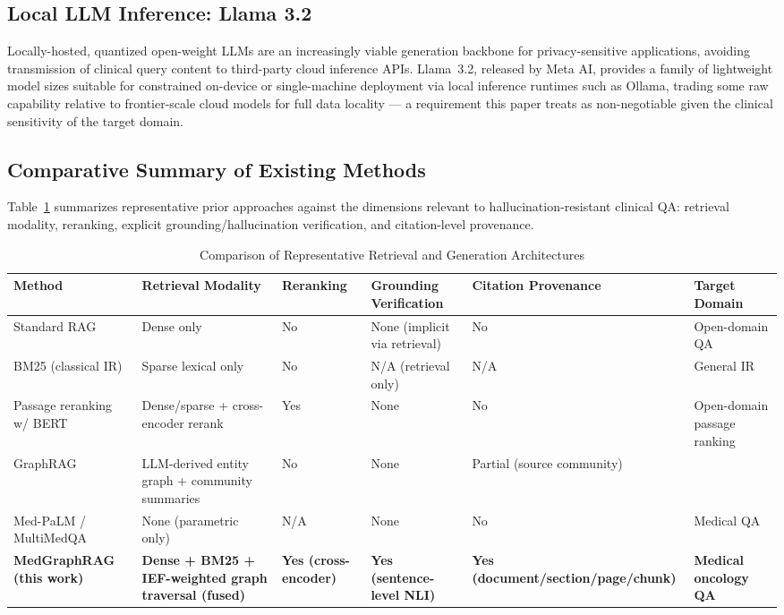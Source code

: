 \documentclass[conference]{IEEEtran}
\begin{document}
\subsection{Local LLM Inference: Llama 3.2}
Locally-hosted, quantized open-weight LLMs are an increasingly viable generation backbone for privacy-sensitive applications, avoiding transmission of clinical query content to third-party cloud inference APIs. Llama~3.2, released by Meta AI, provides a family of lightweight model sizes suitable for constrained on-device or single-machine deployment via local inference runtimes such as Ollama, trading some raw capability relative to frontier-scale cloud models for full data locality --- a requirement this paper treats as non-negotiable given the clinical sensitivity of the target domain.

\subsection{Comparative Summary of Existing Methods}

Table~\ref{tab:comparison} summarizes representative prior approaches against the dimensions relevant to hallucination-resistant clinical QA: retrieval modality, reranking, explicit grounding/hallucination verification, and citation-level provenance.

\begin{table}[t]
\centering
\caption{Comparison of Representative Retrieval and Generation Architectures}
\label{tab:comparison}
\begin{tabular}{@{}p{2.6cm}p{3.0cm}p{2.0cm}p{2.6cm}p{2.9cm}p{2.5cm}@{}}
\toprule
\textbf{Method} & \textbf{Retrieval Modality} & \textbf{Reranking} & \textbf{Grounding Verification} & \textbf{Citation Provenance} & \textbf{Target Domain} \\
\midrule
Standard RAG \cite{lewis2020retrieval} & Dense only & No & None (implicit via retrieval) & No & Open-domain QA \\
BM25 (classical IR) \cite{robertson2009probabilistic} & Sparse lexical only & No & N/A (retrieval only) & N/A & General IR \\
Passage reranking w/ BERT \cite{nogueira2019passage} & Dense/sparse + cross-encoder rerank & Yes & None & No & Open-domain passage ranking \\
GraphRAG \cite{edge2024graphrag} & LLM-derived entity graph + community summaries & No & None & Partial (source community) \\
Med-PaLM / MultiMedQA \cite{singhal2023large} & None (parametric only) & N/A & None & No & Medical QA \\
\textbf{MedGraphRAG (this work)} & \textbf{Dense + BM25 + IEF-weighted graph traversal (fused)} & \textbf{Yes (cross-encoder)} & \textbf{Yes (sentence-level NLI)} & \textbf{Yes (document/section/page/chunk)} & \textbf{Medical oncology QA} \\
\bottomrule
\end{tabular}
\end{table}
\end{document}
